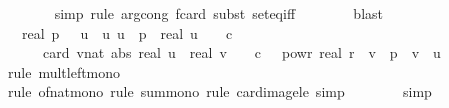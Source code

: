 \begin{isabellebody}
\ \ \ \ \ \ \isamarkupfalse%
\ {\isacharparenleft}{\kern0pt}simp{\isacharcomma}{\kern0pt}\ rule\ arg{\isacharunderscore}{\kern0pt}cong{\isacharbrackleft}{\kern0pt}\ f{\isacharequal}{\kern0pt}{\isachardoublequoteopen}card{\isachardoublequoteclose}{\isacharbrackright}{\kern0pt}{\isacharcomma}{\kern0pt}\ subst\ set{\isacharunderscore}{\kern0pt}eq{\isacharunderscore}{\kern0pt}iff{\isacharparenright}{\kern0pt}\isanewline
\ \ \ \ \ \ \isamarkupfalse%
\ blast\isanewline
\ \ \ \ \isamarkupfalse%
\ \isamarkupfalse%
\ {\isachardoublequoteopen}{\isachardot}{\kern0pt}{\isachardot}{\kern0pt}{\isachardot}{\kern0pt}\ {\isasymle}\ {}{\isacharslash}{\kern0pt}{\isacharparenleft}{\kern0pt}real\ p{\isacharparenright}{\kern0pt}\ {\isacharasterisk}{\kern0pt}\ {\isacharparenleft}{\kern0pt}{\isasymSum}\ u{\isacharprime}{\kern0pt}\ {\isasymin}\ {\isacharbraceleft}{\kern0pt}u{\isachardot}{\kern0pt}\ u\ {\isacharless}{\kern0pt}\ p\ {\isasymand}\ real\ u\ {\isasymle}\ {}\ {\isacharasterisk}{\kern0pt}\ c{\isacharbraceright}{\kern0pt}{\isachardot}{\kern0pt}\isanewline
\ \ \ \ \ \ card\ {\isacharbraceleft}{\kern0pt}{\isacharparenleft}{\kern0pt}v{\isacharcolon}{\kern0pt}{\isacharcolon}{\kern0pt}nat{\isacharparenright}{\kern0pt}{\isachardot}{\kern0pt}\ abs\ {\isacharparenleft}{\kern0pt}real\ u{\isacharprime}{\kern0pt}\ {\isacharminus}{\kern0pt}\ real\ v{\isacharparenright}{\kern0pt}\ {\isasymle}\ {}\ {\isacharasterisk}{\kern0pt}\ c\ {\isacharasterisk}{\kern0pt}\ {}\ powr\ {\isacharparenleft}{\kern0pt}{\isacharminus}{\kern0pt}real\ r{\isacharparenright}{\kern0pt}\ {\isasymand}\ v\ {\isacharless}{\kern0pt}\ p\ {\isasymand}\ v\ {\isasymnoteq}\ u{\isacharprime}{\kern0pt}{\isacharbraceright}{\kern0pt}{\isacharparenright}{\kern0pt}{\isachardoublequoteclose}\isanewline
\ \ \ \ \ \ \isamarkupfalse%
\ {\isacharparenleft}{\kern0pt}rule\ mult{\isacharunderscore}{\kern0pt}left{\isacharunderscore}{\kern0pt}mono{\isacharparenright}{\kern0pt}\isanewline
\ \ \ \ \ \ \ \isamarkupfalse%
\ {\isacharparenleft}{\kern0pt}rule\ of{\isacharunderscore}{\kern0pt}nat{\isacharunderscore}{\kern0pt}mono{\isacharcomma}{\kern0pt}\ rule\ sum{\isacharunderscore}{\kern0pt}mono{\isacharcomma}{\kern0pt}\ rule\ card{\isacharunderscore}{\kern0pt}image{\isacharunderscore}{\kern0pt}le{\isacharcomma}{\kern0pt}\ simp{\isacharparenright}{\kern0pt}\isanewline
\ \ \ \ \ \ \isamarkupfalse%
\ simp\isanewline
\ \ \ \ \isamarkupfalse%

\end{isabellebody}
